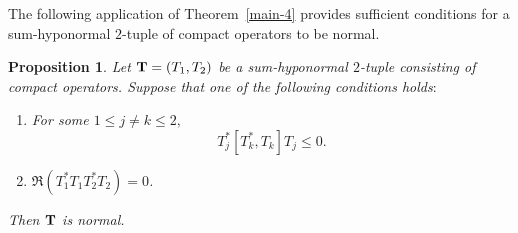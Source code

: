 \documentclass[10pt, a4paper, oneside, reqno]{amsproc}
\numberwithin{equation}{section}
\newtheorem{proposition}[theorem]{Proposition}
\theoremstyle{remark}
\theoremstyle{definition}
\newcommand*{\Le}{\leqslant}
\begin{document}
The following application of Theorem~\ref{main-4} provides sufficient conditions for a sum-hyponormal $2$-tuple of compact operators to be normal.
\begin{proposition} \label{mixed-cohypo-coro}
Let ${\bf T}=(T_1,T_2)$ be a sum-hyponormal $2$-tuple consisting of compact operators. 
Suppose that one of the following conditions holds$:$
\begin{enumerate}
\item[(a)] For some $1 \Le j \neq k \Le 2,$ 
\begin{equation}
\label{mixed-hypo}
T^*_j[T^*_k, T_k]T_j \Le 0.
\end{equation} 
\item[(b)] $\Re(T_1^*T_1T_2^*T_2)=0$.
\end{enumerate}
Then ${\bf T}$ is normal. 
\end{proposition}
\end{document}
